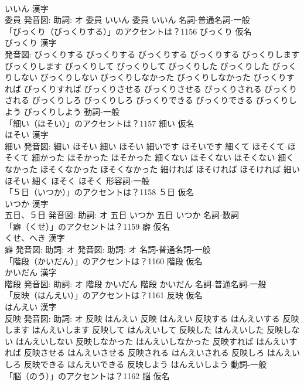 \documentclass[8pt]{extreport}
\begin{document}
\begin{CJK}{UTF8}{min}
\\	いいん 漢字　
\\	委員 発音図: 助詞: オ	委員 いいん		委員 いいん				名詞-普通名詞-一般 
\\	「びっくり（びっくりする）」のアクセントは？1156	びっくり 仮名　
\\	びっくり 漢字　
\\	発音図:	びっくりする びっくりする		びっくりする びっくりする びっくりします びっくりします びっくりして びっくりして びっくりした びっくりした びっくりしない びっくりしない びっくりしなかった びっくりしなかった びっくりすれば びっくりすれば びっくりさせる びっくりさせる びっくりされる びっくりされる びっくりしろ びっくりしろ びっくりできる びっくりできる びっくりしよう びっくりしよう				動詞-一般 
\\	「細い（ほそい）」のアクセントは？1157	細い 仮名　
\\	ほそい 漢字　
\\	細い 発音図:	細い ほそい		細い ほそい 細いです ほそいです 細くて ほそくて ほそくて 細かった ほそかった ほそかった 細くない ほそくない ほそくない 細くなかった ほそくなかった ほそくなかった 細ければ ほそければ ほそければ 細い ほそい 細く ほそく ほそく				形容詞-一般 
\\	「５日（いつか）」のアクセントは？1158	５日 仮名　
\\	いつか 漢字　
\\	五日、５日 発音図: 助詞: オ	五日 いつか		五日 いつか				名詞-数詞 
\\	「癖（くせ）」のアクセントは？1159	癖 仮名　
\\	くせ、へき 漢字　
\\	癖 発音図: 助詞: オ 発音図: 助詞: オ							名詞-普通名詞-一般 
\\	「階段（かいだん）」のアクセントは？1160	階段 仮名　
\\	かいだん 漢字　
\\	階段 発音図: 助詞: オ	階段 かいだん		階段 かいだん				名詞-普通名詞-一般 
\\	「反映（はんえい）」のアクセントは？1161	反映 仮名　
\\	はんえい 漢字　
\\	反映 発音図: 助詞: オ	反映 はんえい		反映 はんえい 反映する はんえいする 反映します はんえいします 反映して はんえいして 反映した はんえいした 反映しない はんえいしない 反映しなかった はんえいしなかった 反映すれば はんえいすれば 反映させる はんえいさせる 反映される はんえいされる 反映しろ はんえいしろ 反映できる はんえいできる 反映しよう はんえいしよう				動詞-一般 
\\	「脳（のう）」のアクセントは？1162	脳 仮名　

\end{CJK}
\end{document}
